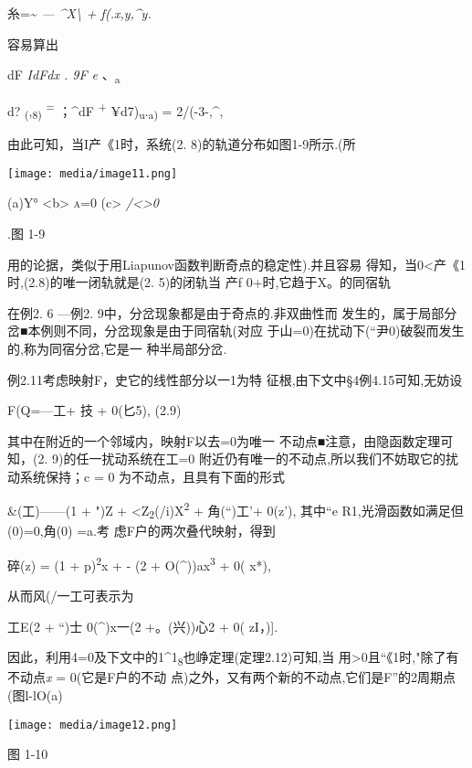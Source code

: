 \documentclass{article}
\begin{document}
糸=\textasciitilde{} \emph{--- \^{}X\textbackslash{} + f(.x,y,\^{}y.}

容易算出

dF \emph{IdFdx . 9F e} 、\textsubscript{a}

d? \textsubscript{(},\textsubscript{8)} \textsuperscript{=} ；\^{}dF
\textsuperscript{+} ¥d7)\textsubscript{u}.\textsubscript{a)} =
2/(-3-,\^{},

由此可知，当I产\textbar{}《1时，系统(2. 8)的轨道分布如图1-9所示.(所

\texttt{[image: media/image11.png]}

(a)Y° \textless{}b\textgreater{} \textsc{a=0} (c\textgreater{}
\emph{/\textless{}\textgreater{}0}

.图 1-9

用的论据，类似于用Liapunov函数判断奇点的稳定性).并且容易
得知，当0\textless{}产《1时,(2.8)的唯一闭轨就是(2. 5)的闭轨当 产f
0+时,它趋于X。的同宿轨

在例2. 6 ---例2. 9中，分岔现象都是由于奇点的.非双曲性而
发生的，属于局部分岔■本例则不同，分岔现象是由于同宿轨(对应
于山=0)在扰动下(``尹0)破裂而发生的,称为同宿分岔,它是一 种半局部分岔.

例2.11考虑映射F，史它的线性部分以一1为特
征根,由下文中§4例4.15可知,无妨设

F(Q=---工+ 技 + 0(匕\textbar{}5), (2.9)

其中在附近的一个邻域内，映射F以去=0为唯一
不动点■注意，由隐函数定理可知，(2. 9)的任一扰动系统在工=0
附近仍有唯一的不动点,所以我们不妨取它的扰动系统保持；c = 0
为不动点，且具有下面的形式

\&(工)------(1 + ")Z +
\textless{}Z\textsubscript{2}(/i)X\textsuperscript{2} + 角(``)工'+
0(\textbar{}z\textbar{}'), 其中``e R1,光滑函数如满足但(0)=0,角(0) =a.考
虑F户的两次叠代映射，得到

碎(z) = (1 + p)\textsuperscript{2}x + - (2 +
O(\^{}))ax\textsuperscript{3} + 0( \textbar{}x\textbar{}*),

从而风(/一工可表示为

工E(2 + ``)士 0(\^{})x一(2 +。(兴))心2 + 0( \textbar{}zI，){]}.

因此，利用4=0及下文中的1\^{}1\textsubscript{8}也峥定理(定理2.12)可知,当
用\textgreater{}0且\textbar{}``\textbar{}《1时,"除了有不动点\emph{x} =
0(它是F户的不动 点)之外，又有两个新的不动点,它们是F''的2周期点(图l-lO(a)

\texttt{[image: media/image12.png]}

图 1-10
\end{document}

